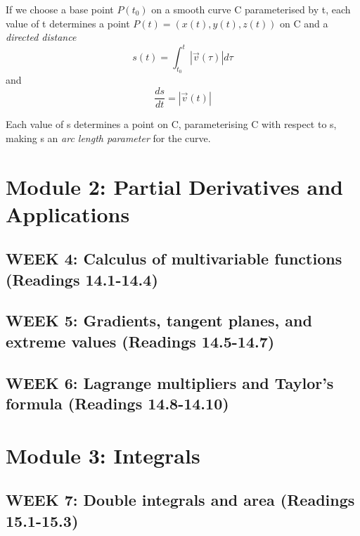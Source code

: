 \documentclass[12pt]{article}
\begin{document}
If we choose a base point $P(t_0)$ on a smooth curve C parameterised by t, each value of t determines a point $P(t) = (x(t), y(t), z(t))$ on C and a \emph{directed distance}
$$s(t) = \int_{t_0}^t |\vec{v}(\tau)| d \tau$$
and 
$$\frac{ds}{dt} = |\vec{v}(t)|$$ 

Each value of s determines a point on C, parameterising C with respect to s, making s an \emph{arc length parameter} for the curve. 
\pagebreak
\section{Module 2: Partial Derivatives and Applications}
\subsection{WEEK 4: Calculus of multivariable functions (Readings 14.1-14.4)}

\subsection{WEEK 5: Gradients, tangent planes, and extreme values (Readings 14.5-14.7)}

\subsection{WEEK 6: Lagrange multipliers and Taylor's formula (Readings 14.8-14.10)}

\pagebreak
\section{Module 3: Integrals}
\subsection{WEEK 7: Double integrals and area (Readings 15.1-15.3)}
\end{document}
